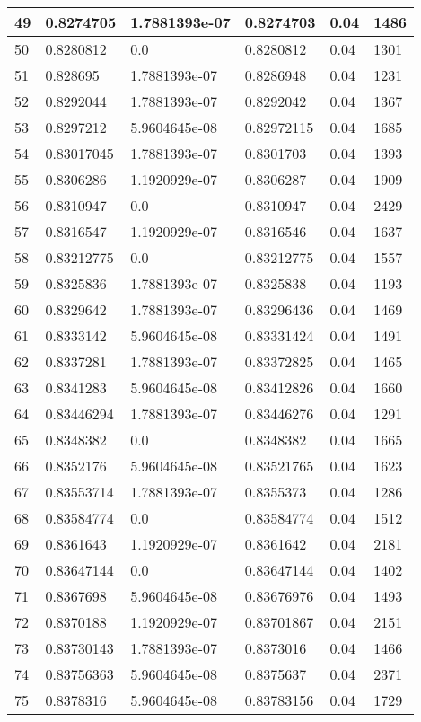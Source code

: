 \begin{longtable}{|l|l|l|l|l|l|}
49 & 0.8274705 & 1.7881393e-07 & 0.8274703 & 0.04 & 1486 \\ \hline 
50 & 0.8280812 & 0.0 & 0.8280812 & 0.04 & 1301 \\ \hline 
51 & 0.828695 & 1.7881393e-07 & 0.8286948 & 0.04 & 1231 \\ \hline 
52 & 0.8292044 & 1.7881393e-07 & 0.8292042 & 0.04 & 1367 \\ \hline 
53 & 0.8297212 & 5.9604645e-08 & 0.82972115 & 0.04 & 1685 \\ \hline 
54 & 0.83017045 & 1.7881393e-07 & 0.8301703 & 0.04 & 1393 \\ \hline 
55 & 0.8306286 & 1.1920929e-07 & 0.8306287 & 0.04 & 1909 \\ \hline 
56 & 0.8310947 & 0.0 & 0.8310947 & 0.04 & 2429 \\ \hline 
57 & 0.8316547 & 1.1920929e-07 & 0.8316546 & 0.04 & 1637 \\ \hline 
58 & 0.83212775 & 0.0 & 0.83212775 & 0.04 & 1557 \\ \hline 
59 & 0.8325836 & 1.7881393e-07 & 0.8325838 & 0.04 & 1193 \\ \hline 
60 & 0.8329642 & 1.7881393e-07 & 0.83296436 & 0.04 & 1469 \\ \hline 
61 & 0.8333142 & 5.9604645e-08 & 0.83331424 & 0.04 & 1491 \\ \hline 
62 & 0.8337281 & 1.7881393e-07 & 0.83372825 & 0.04 & 1465 \\ \hline 
63 & 0.8341283 & 5.9604645e-08 & 0.83412826 & 0.04 & 1660 \\ \hline 
64 & 0.83446294 & 1.7881393e-07 & 0.83446276 & 0.04 & 1291 \\ \hline 
65 & 0.8348382 & 0.0 & 0.8348382 & 0.04 & 1665 \\ \hline 
66 & 0.8352176 & 5.9604645e-08 & 0.83521765 & 0.04 & 1623 \\ \hline 
67 & 0.83553714 & 1.7881393e-07 & 0.8355373 & 0.04 & 1286 \\ \hline 
68 & 0.83584774 & 0.0 & 0.83584774 & 0.04 & 1512 \\ \hline 
69 & 0.8361643 & 1.1920929e-07 & 0.8361642 & 0.04 & 2181 \\ \hline 
70 & 0.83647144 & 0.0 & 0.83647144 & 0.04 & 1402 \\ \hline 
71 & 0.8367698 & 5.9604645e-08 & 0.83676976 & 0.04 & 1493 \\ \hline 
72 & 0.8370188 & 1.1920929e-07 & 0.83701867 & 0.04 & 2151 \\ \hline 
73 & 0.83730143 & 1.7881393e-07 & 0.8373016 & 0.04 & 1466 \\ \hline 
74 & 0.83756363 & 5.9604645e-08 & 0.8375637 & 0.04 & 2371 \\ \hline 
75 & 0.8378316 & 5.9604645e-08 & 0.83783156 & 0.04 & 1729 \\ \hline 
\end{longtable}